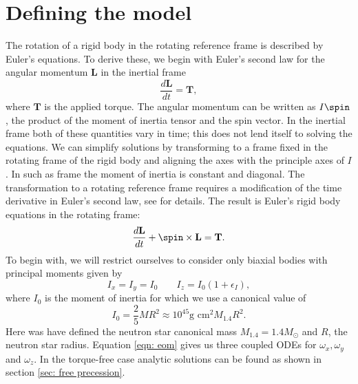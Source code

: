 \documentclass[/home/greg/Thesis/main/main.tex]{subfiles}
\begin{document}
\section{Defining the model}

The rotation of a rigid body in the rotating reference frame is described by
Euler's equations. To derive these, we begin with Euler's second law  for the
angular momentum $\mathbf{L}$ in the inertial frame
\begin{equation}
    \frac{d\mathbf{L}}{dt}=\mathbf{T},
\end{equation}
where $\mathbf{T}$ is the applied torque. The angular momentum can be written
as $I \spin$, the product of the moment of inertia tensor and the spin vector.
In the inertial frame both of these quantities vary in time; this does not lend
itself to solving the equations. We can simplify solutions by transforming to a
frame fixed in the rotating frame of the rigid body and aligning the axes with
the principle axes of $I$. In such as frame the moment of inertia is constant
and diagonal. The transformation to a rotating reference frame requires a
modification of the time derivative in Euler's second law, see \citet{Landau1969}
for details. The result is Euler's rigid body equations in the rotating frame:
\begin{equation}
    \frac{d\mathbf{L}}{dt} + \spin \times \mathbf{L} = \mathbf{T}.
    \label{eqn: eom}
\end{equation}
To begin with, we will restrict ourselves to consider only biaxial bodies with 
principal moments given by
\begin{equation}
I_{x} = I_{y} = I_{0} \;\;\;\;\;\;\; I_{z} = I_{0}(1+\epsilon_{I}),
\end{equation}
where $I_{0}$ is the moment of inertia for which we use a canonical value of 
\begin{equation}
I_{0} = \frac{2}{5}MR^{2} \approx 10^{45}\textrm{g cm}^{2} M_{1.4}R^{2}.
\end{equation}
Here was have defined the neutron star canonical mass $M_{1.4} = 1.4 M_{\odot}$ 
and $R$, the neutron star radius.
Equation \ref{eqn: eom} gives us three coupled ODEs for $\omega_{x}, 
\omega_{y}$ and $\omega_{z}$. In the torque-free case analytic solutions can be
found as shown in section \ref{sec: free precession}.
\end{document}

